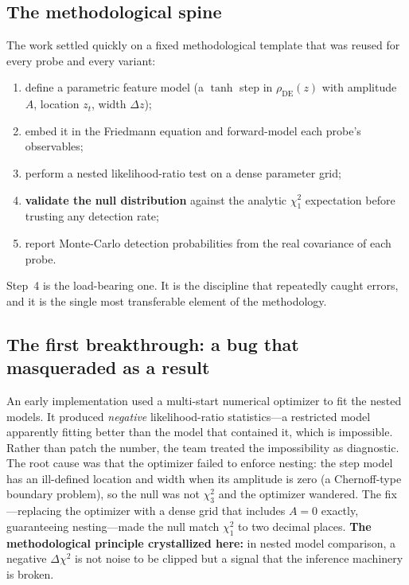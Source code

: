 \documentclass[11pt]{article}
\newcommand{\rhoDE}{\rho_{\mathrm{DE}}}
\begin{document}
\subsection{The methodological spine}

The work settled quickly on a fixed methodological template that was reused for
every probe and every variant:
\begin{enumerate}[leftmargin=1.5em]
  \item define a parametric feature model (a $\tanh$ step in $\rhoDE(z)$ with
        amplitude $A$, location $z_t$, width $\Delta z$);
  \item embed it in the Friedmann equation and forward-model each probe's
        observables;
  \item perform a nested likelihood-ratio test on a dense parameter grid;
  \item \textbf{validate the null distribution} against the analytic
        $\chi^2_1$ expectation before trusting any detection rate;
  \item report Monte-Carlo detection probabilities from the real covariance of
        each probe.
\end{enumerate}
Step~4 is the load-bearing one. It is the discipline that repeatedly caught errors,
and it is the single most transferable element of the methodology.

\subsection{The first breakthrough: a bug that masqueraded as a result}

An early implementation used a multi-start numerical optimizer to fit the nested
models. It produced \emph{negative} likelihood-ratio statistics---a restricted
model apparently fitting better than the model that contained it, which is
impossible. Rather than patch the number, the team treated the impossibility as
diagnostic. The root cause was that the optimizer failed to enforce nesting: the
step model has an ill-defined location and width when its amplitude is zero (a
Chernoff-type boundary problem), so the null was not $\chi^2_3$ and the optimizer
wandered. The fix---replacing the optimizer with a dense grid that includes
$A=0$ exactly, guaranteeing nesting---made the null match $\chi^2_1$ to two
decimal places. \textbf{The methodological principle crystallized here:} in
nested model comparison, a negative $\Delta\chi^2$ is not noise to be clipped but
a signal that the inference machinery is broken.
\end{document}

